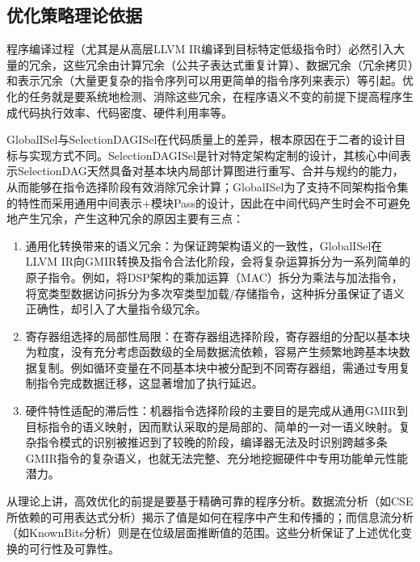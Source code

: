 \subsection{优化策略理论依据}
程序编译过程（尤其是从高层LLVM IR编译到目标特定低级指令时）必然引入大量的冗余，这些冗余由计算冗余（公共子表达式重复计算）、数据冗余（冗余拷贝）和表示冗余（大量更复杂的指令序列可以用更简单的指令序列来表示）等引起。优化的任务就是要系统地检测、消除这些冗余，在程序语义不变的前提下提高程序生成代码执行效率、代码密度、硬件利用率等。

\par
GlobalISel与SelectionDAGISel在代码质量上的差异，根本原因在于二者的设计目标与实现方式不同。SelectionDAGISel是针对特定架构定制的设计，其核心中间表示SelectionDAG天然具备对基本块内局部计算图进行重写、合并与规约的能力，从而能够在指令选择阶段有效消除冗余计算；GlobalISel为了支持不同架构指令集的特性而采用通用中间表示+模块Pass的设计，因此在中间代码产生时会不可避免地产生冗余，产生这种冗余的原因主要有三点：

\begin{enumerate}
	\item
	通用化转换带来的语义冗余：为保证跨架构语义的一致性，GlobalISel在LLVM IR向GMIR转换及指令合法化阶段，会将复杂运算拆分为一系列简单的原子指令。例如，将DSP架构的乘加运算（MAC）拆分为乘法与加法指令，将宽类型数据访问拆分为多次窄类型加载/存储指令，这种拆分虽保证了语义正确性，却引入了大量指令级冗余。
	
	\item
	寄存器组选择的局部性局限：在寄存器组选择阶段，寄存器组的分配以基本块为粒度，没有充分考虑函数级的全局数据流依赖，容易产生频繁地跨基本块数据复制。例如循环变量在不同基本块中被分配到不同寄存器组，需通过专用复制指令完成数据迁移，这显著增加了执行延迟。
	
	\item 
	硬件特性适配的滞后性：机器指令选择阶段的主要目的是完成从通用GMIR到目标指令的语义映射，因而默认采取的是局部的、简单的一对一语义映射。复杂指令模式的识别被推迟到了较晚的阶段，编译器无法及时识别跨越多条GMIR指令的复杂语义，也就无法完整、充分地挖掘硬件中专用功能单元性能潜力。
	
\end{enumerate}

从理论上讲，高效优化的前提是要基于精确可靠的程序分析。数据流分析（如CSE所依赖的可用表达式分析）揭示了值是如何在程序中产生和传播的；而信息流分析（如KnownBits分析）则是在位级层面推断值的范围。这些分析保证了上述优化变换的可行性及可靠性。

\par

